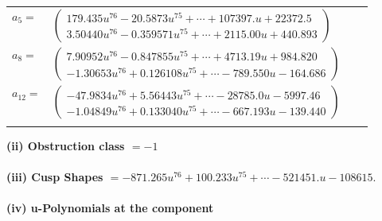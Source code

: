 \documentclass[1p]{elsarticle_modified}
\theoremstyle{definition}
\begin{document}
\begin{tabular}{m{7pt} m{180pt} m{7pt} m{180pt} }
\flushright $a_{5}=$&$\begin{pmatrix}179.435 u^{76}-20.5873 u^{75}+\cdots+107397. u+22372.5\\3.50440 u^{76}-0.359571 u^{75}+\cdots+2115.00 u+440.893\end{pmatrix}$ \\
\flushright $a_{8}=$&$\begin{pmatrix}7.90952 u^{76}-0.847855 u^{75}+\cdots+4713.19 u+984.820\\-1.30653 u^{76}+0.126108 u^{75}+\cdots-789.550 u-164.686\end{pmatrix}$ \\
\flushright $a_{12}=$&$\begin{pmatrix}-47.9834 u^{76}+5.56443 u^{75}+\cdots-28785.0 u-5997.46\\-1.04849 u^{76}+0.133040 u^{75}+\cdots-667.193 u-139.440\end{pmatrix}$\\&\end{tabular}
\flushleft \textbf{(ii) Obstruction class $= -1$}\\~\\
\flushleft \textbf{(iii) Cusp Shapes $= -871.265 u^{76}+100.233 u^{75}+\cdots-521451. u-108615.$}\\~\\
\newpage\renewcommand{\arraystretch}{1}
\flushleft \textbf{(iv) u-Polynomials at the component}\newline \\
\end{document}
